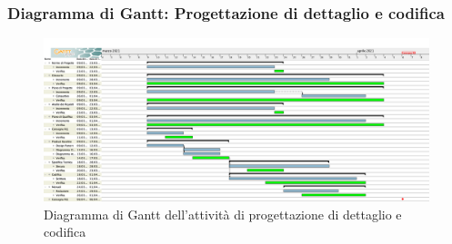 \subsubsection{Diagramma di Gantt: Progettazione di dettaglio e codifica} \label{GanttPDettaglio}
\begin{figure}[ht]
    \centering
    \includegraphics[width=\textwidth]{Immagini/GanttProgettazioneDiDettaglioECodifica}
    \caption{Diagramma di Gantt dell'attività di progettazione di dettaglio e codifica}
\end{figure}